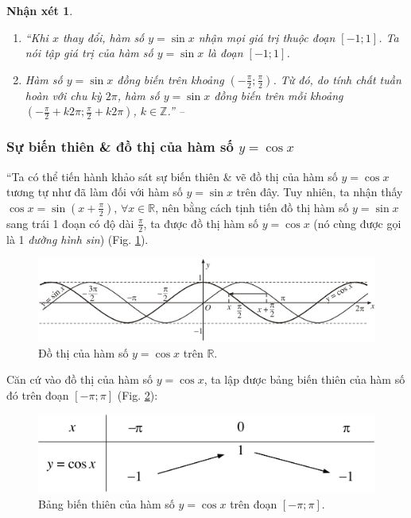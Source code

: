 \documentclass[oneside]{book}
\numberwithin{equation}{section}
\newtheorem{nhanxet}{Nhận xét}[section]
\begin{document}
\begin{nhanxet}
	\begin{enumerate}
		\item ``Khi $x$ thay đổi, hàm số $y = \sin x$ nhận mọi giá trị thuộc đoạn $[-1;1]$. Ta nói \emph{tập giá trị} của hàm số $y = \sin x$ là đoạn $[-1;1]$.
		\item Hàm số $y = \sin x$ đồng biến trên khoảng $\left(-\frac{\pi}{2};\frac{\pi}{2}\right)$. Từ đó, do tính chất tuần hoàn với chu kỳ $2\pi$, hàm số $y = \sin x$ đồng biến trên mỗi khoảng $\left(-\frac{\pi}{2} + k2\pi;\frac{\pi}{2} + k2\pi\right)$, $k\in\mathbb{Z}$.'' -- \cite[p. 7]{SGK_Toan_11_dai_so_giai_tich_nang_cao}
	\end{enumerate}
\end{nhanxet}

\subsubsection{Sự biến thiên \& đồ thị của hàm số $y = \cos x$}
``Ta có thể tiến hành khảo sát sự biến thiên \& vẽ đồ thị của hàm số $y = \cos x$ tương tự như đã làm đối với hàm số $y = \sin x$ trên đây. Tuy nhiên, ta nhận thấy $\cos x = \sin\left(x + \frac{\pi}{2}\right)$, $\forall x\in\mathbb{R}$, nên bằng cách tịnh tiến đồ thị hàm số $y = \sin x$ sang trái 1 đoạn có độ dài $\frac{\pi}{2}$, ta được đồ thị hàm số $y = \cos x$ (nó cùng được gọi là 1 \textit{đường hình sin}) (Fig. \ref{fig:graph cos}).

\begin{figure}[H]
	\centering
	\includegraphics[scale=0.2]{graph_cos}
	\caption{Đồ thị của hàm số $y = \cos x$ trên $\mathbb{R}$.}
	\label{fig:graph cos}
\end{figure}
Căn cứ vào đồ thị của hàm số $y = \cos x$, ta lập được bảng biến thiên của hàm số đó trên đoạn $[-\pi;\pi]$ (Fig. \ref{fig:bang bien thien cos}):

\begin{figure}[H]
	\centering
	\includegraphics[scale=0.15]{bang_bien_thien_cos}
	\caption{Bảng biến thiên của hàm số $y = \cos x$ trên đoạn $[-\pi;\pi]$.}
	\label{fig:bang bien thien cos}
\end{figure}
\end{document}
